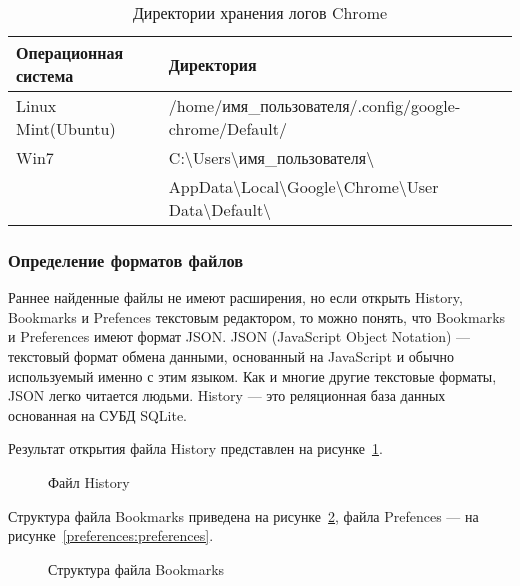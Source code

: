 \begin{table}[ht]
\caption{Директории хранения логов Chrome}
\label{tab:logs}
\begin{center}
\begin{tabularx}{\linewidth}{|l|X|}
\hline
Операционная система & Директория \\
\hline
Linux Mint(Ubuntu) & /home/имя\_пользователя/.config/google-chrome/Default/ \\
\hline
Win7 & C:\textbackslash  Users\textbackslash  имя\_пользователя\textbackslash \\ & AppData\textbackslash  Local\textbackslash  Google\textbackslash  Chrome\textbackslash  User Data\textbackslash  Default\textbackslash \\
\hline
\end{tabularx}
\end{center}
\end{table}


\subsubsection{Определение форматов файлов}
Раннее найденные файлы  не имеют расширения, но если открыть History, 
Bookmarks и Prefences текстовым редактором, то можно понять, что Bookmarks и Preferences имеют формат JSON. JSON (JavaScript Object Notation) — текстовый формат обмена данными, основанный на JavaScript и обычно используемый именно с этим языком. Как и многие другие текстовые форматы, JSON легко читается людьми. History --- это реляционная база данных основанная на СУБД SQLite.

Результат открытия файла History представлен на рисунке~\ref{history:history}.

\begin{figure}[h!]
\caption{Файл History}
\label{history:history}
\end{figure}

Структура файла Bookmarks приведена на рисунке~\ref{bookmarks:bookmarks}, файла Prefences --- на рисунке~\ref{preferences:preferences}.

\begin{figure}[h!]
\caption{Структура файла Bookmarks}
\label{bookmarks:bookmarks}
\end{figure}


